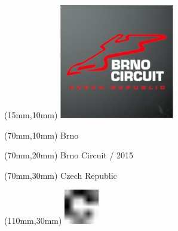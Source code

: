 \null\newpage
\begin{textblock*}{50mm}(15mm,10mm)%
\includegraphics[width=50mm]{LG/2015-05-20_00075.png}
\end{textblock*}
\begin{textblock*}{130mm}(70mm,10mm)%
{\fontsize{20}{20}\selectfont Brno}\\
\end{textblock*}
\begin{textblock*}{120mm}(70mm,20mm)%
{\fontsize{16}{16}\selectfont Brno Circuit / 2015}\\
\end{textblock*}
\begin{textblock*}{120mm}(70mm,30mm)%
{\fontsize{12}{12}\selectfont Czech Republic}
\end{textblock*}
\begin{textblock*}{30mm}(110mm,30mm)%
\centering
\includegraphics[height=15mm]{icons/fa-rotate-right.pdf}
\end{textblock*}
